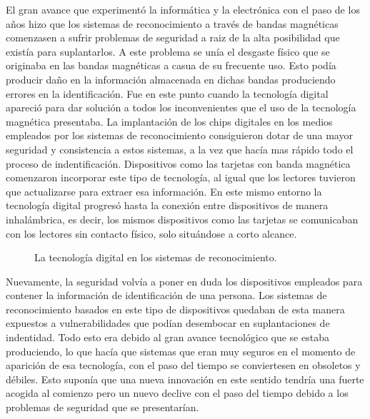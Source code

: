 El gran avance que experimentó la informática y la electrónica con el paso de los años hizo que los sistemas de reconocimiento a través de bandas magnéticas comenzasen a sufrir problemas de seguridad a raiz de la alta posibilidad que existía para suplantarlos. A este problema se unía el desgaste físico que se originaba en las bandas magnéticas a casua de su frecuente uso. Esto podía producir daño en la información almacenada en dichas bandas produciendo errores en la identificación. Fue en este punto cuando la tecnología digital apareció para dar solución a todos los inconvenientes que el uso de la tecnología magnética presentaba. La implantación de los chips digitales en los medios empleados por los sistemas de reconocimiento consiguieron dotar de una mayor seguridad y consistencia a estos sistemas, a la vez que hacía mas rápido todo el proceso de indentificación. Dispositivos como las tarjetas con banda magnética comenzaron incorporar este tipo de tecnología, al igual que los lectores tuvieron que actualizarse para extraer esa información. En este mismo entorno la tecnología digital progresó hasta la conexión entre dispositivos de manera inhalámbrica, es decir, los mismos dispositivos como las tarjetas se comunicaban con los lectores sin contacto físico, solo situándose a corto alcance. \\

\begin{figure}[htbp]
\centering
{}
\caption{La tecnología digital en los sistemas de reconocimiento.} \label{fig:señales}
\end{figure}

Nuevamente, la seguridad volvía a poner en duda los dispositivos empleados para contener la información de identificación de una persona. Los sistemas de reconocimiento basados en este tipo de dispositivos quedaban de esta manera expuestos a vulnerabilidades que podían desembocar en suplantaciones de indentidad. Todo esto era debido al gran avance tecnológico que se estaba produciendo, lo que hacía que sistemas que eran muy seguros en el momento de aparición de esa tecnología, con el paso del tiempo se conviertesen en obsoletos y débiles. Esto suponía que una nueva innovación en este sentido tendría una fuerte acogida al comienzo pero un nuevo declive con el paso del tiempo debido a los problemas de seguridad que se presentarían. \\


